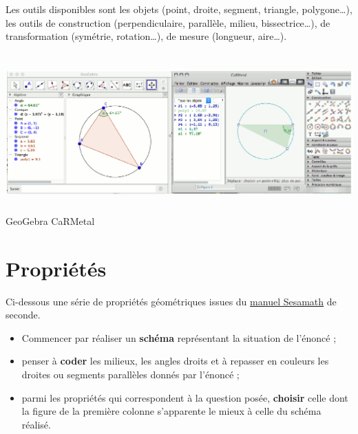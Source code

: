 Les outils disponibles sont les objets (point, droite, segment, triangle, polygone\dots), les outils de construction (perpendiculaire, parallèle, milieu, bissectrice\dots), de transformation (symétrie, rotation\dots), de mesure (longueur, aire\dots).

\begin{center}
   \includegraphics[height=6.1cm]{Geometrie/Images/G9_cours_dynamique} \\
   GeoGebra \hspace{7cm} CaRMetal
\end{center}


\section{Propriétés} %

Ci-dessous une série de propriétés géométriques issues du \href{http://mep-outils.sesamath.net/manuel_numerique/index.php?ouvrage=ms2_2014&page_gauche=267}{\blue manuel Sesamath} de seconde.

{\renewcommand{\StringDOCUMENTATION}{Une trame pour démontrer en géométrie}
\begin{documentation}
\begin{itemize}
   \item Commencer par réaliser un {\bf schéma} représentant la situation de l'énoncé ;
   \item penser à {\bf coder} les milieux, les angles droits et à repasser en couleurs les droites ou segments parallèles donnés par l'énoncé ;
   \item parmi les propriétés qui correspondent à la question posée, {\bf choisir} celle dont la figure de la première colonne s'apparente le mieux à celle du schéma réalisé. \\ [-8mm]
\end{itemize}
\end{documentation}}

